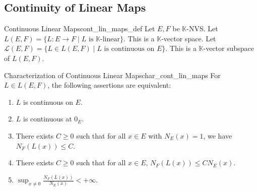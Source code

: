 \documentclass[11pt, a4paper]{article}
\begin{document}
\subsection{Continuity of Linear Maps}
\begin{definition}{Continuous Linear Maps}{cont_lin_maps_def}
Let $E, F$ be $\mathbb{K}$-NVS.
Let $L(E,F) = \{L: E \to F \mid L \text{ is } \mathbb{K}\text{-linear}\}$. This is a $\mathbb{K}$-vector space.
Let $\mathcal{L}(E,F) = \{L \in L(E,F) \mid L \text{ is continuous on } E\}$. This is a $\mathbb{K}$-vector subspace of $L(E,F)$.
\end{definition}

\begin{theorem}{Characterization of Continuous Linear Maps}{char_cont_lin_maps}
For $L \in L(E,F)$, the following assertions are equivalent:
\begin{enumerate}
    \item $L$ is continuous on $E$.
    \item $L$ is continuous at $0_E$.
    \item There exists $C \ge 0$ such that for all $x \in E$ with $N_E(x) = 1$, we have $N_F(L(x)) \le C$.
    \item There exists $C \ge 0$ such that for all $x \in E$, $N_F(L(x)) \le C N_E(x)$.
    \item $\sup_{x \neq 0} \frac{N_F(L(x))}{N_E(x)} < +\infty$.
\end{enumerate}
\end{theorem}
\end{document}
